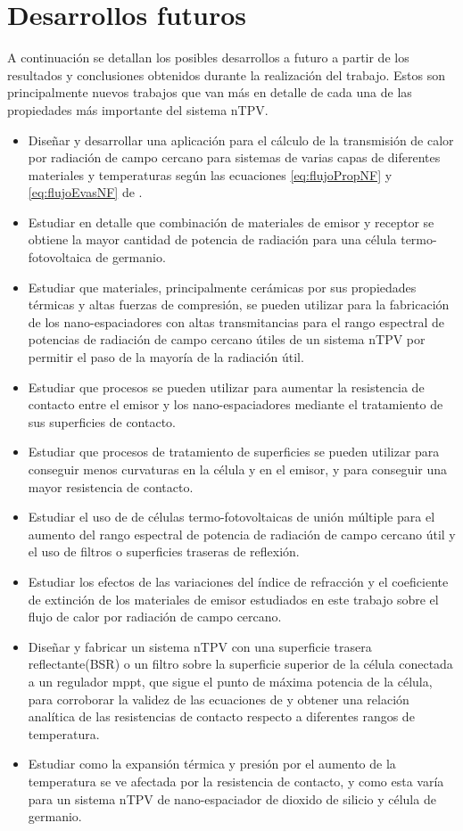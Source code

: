 \section{Desarrollos futuros}
A continuación se detallan los posibles desarrollos a futuro a partir de los resultados y conclusiones obtenidos durante la realización del trabajo. Estos son principalmente nuevos trabajos que van más en detalle de cada una de las propiedades más importante del sistema nTPV.
\begin{itemize}
	\item Diseñar y desarrollar una aplicación para el cálculo de la transmisión de calor por radiación de campo cercano para sistemas de varias capas de diferentes materiales y temperaturas según las ecuaciones \eqref{eq:flujoPropNF} y \eqref{eq:flujoEvasNF} de \cite{nfTPV_fullEquations}.
	\item Estudiar en detalle que combinación de materiales de emisor y receptor se obtiene la mayor cantidad de potencia de radiación para una célula termo-fotovoltaica de germanio.
	\item Estudiar que materiales, principalmente cerámicas por sus propiedades térmicas y altas fuerzas de compresión, se pueden utilizar para la fabricación de los nano-espaciadores con altas transmitancias para el rango espectral de potencias de radiación de campo cercano útiles de un sistema nTPV por permitir el paso de la mayoría de la radiación útil.
	\item Estudiar que procesos se pueden utilizar para aumentar la resistencia de contacto entre el emisor y los nano-espaciadores mediante el tratamiento de sus superficies de contacto.
	\item Estudiar que procesos de tratamiento de superficies se pueden utilizar para conseguir menos curvaturas en la célula y en el emisor, y para conseguir una mayor resistencia de contacto.
	\item Estudiar el uso de de células termo-fotovoltaicas de unión múltiple para el aumento del rango espectral de potencia de radiación de campo cercano útil y el uso de filtros o superficies traseras de reflexión.
	\item Estudiar los efectos de las variaciones del índice de refracción y el coeficiente de extinción de los materiales de emisor estudiados en este trabajo sobre el flujo de calor por radiación de campo cercano.
	\item Diseñar y fabricar un sistema nTPV con una superficie trasera reflectante(BSR) o un filtro sobre la superficie superior de la célula conectada a un regulador mppt, que sigue el punto de máxima potencia de la célula, para corroborar la validez de las ecuaciones de \cite{nfTPV_fullEquations} y obtener una relación analítica de las resistencias de contacto respecto a diferentes rangos de temperatura.
	\item Estudiar como la expansión térmica y presión por el aumento de la temperatura se ve afectada por la resistencia de contacto, y como esta varía para un sistema nTPV de nano-espaciador de dioxido de silicio y célula de germanio.
\end{itemize}